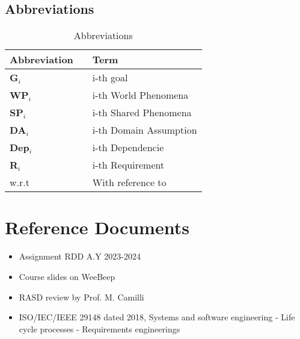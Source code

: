 \subsection{Abbreviations}
\begin{table}[H]
    \centering
    \renewcommand{\arraystretch}{1.5}
    \begin{tabular}{l l p{10.5cm}}
        \hline
        \textbf{Abbreviation} &  & \textbf{Term}         \\
        \hline
        \textbf{G}\(_i\)      &  & i-th goal             \\
        \textbf{WP}\(_i\)     &  & i-th World Phenomena  \\
        \textbf{SP}\(_i\)     &  & i-th Shared Phenomena \\
        \textbf{DA}\(_i\)     &  & i-th Domain Assumption\\
        \textbf{Dep}\(_i\)    &  & i-th Dependencie      \\
        \textbf{R}\(_i\)      &  & i-th Requirement      \\
        w.r.t                 &  & With reference to     \\
        \hline
    \end{tabular}
    \caption{Abbreviations}
\end{table}

\section{Reference Documents}
\begin{itemize}
    \item Assignment RDD A.Y 2023-2024
    \item Course slides on WeeBeep
    \item RASD review by Prof. M. Camilli
    \item ISO/IEC/IEEE 29148 dated 2018, Systems and software engineering - Life cycle processes - Requirements engineerings
\end{itemize}

